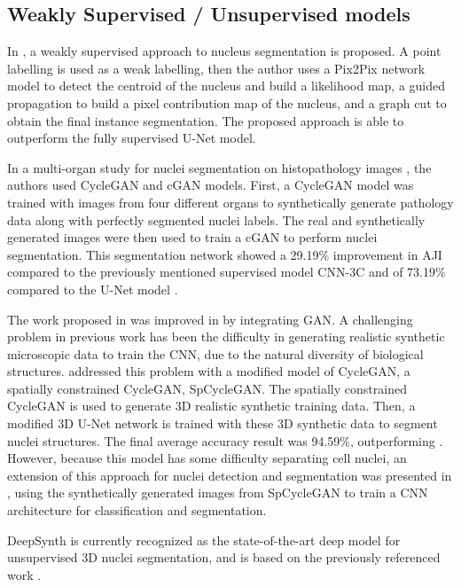 \subsection{Weakly Supervised / Unsupervised models}

In \cite{weakly:GAN}, a weakly supervised approach to nucleus segmentation is proposed. A point labelling is used as a weak labelling, then the author uses a Pix2Pix network model to detect the centroid of the nucleus and build a likelihood map, a guided propagation to build a pixel contribution map of the nucleus, and a graph cut to obtain the final instance segmentation. The proposed approach is able to outperform the fully supervised U-Net \cite{Unet:2D} model.

In a multi-organ study for nuclei segmentation on histopathology images \cite{cGAN:cycleGAN}, the authors used CycleGAN and \ac{cGAN} models. First, a CycleGAN model was trained with images from four different organs to synthetically generate pathology data along with perfectly segmented nuclei labels. The real and synthetically generated images were then used to train a \ac{cGAN} to perform nuclei segmentation. This segmentation network showed a 29.19\% improvement in \ac{AJI} compared to the previously mentioned supervised model \ac{CNN}-3C \cite{CNN3} and of 73.19\% compared to the U-Net model \cite{Unet:2D}.


The work proposed in \cite{SOTA:3DCNN} was improved in \cite{3D:CycleGAN} by integrating \ac{GAN}. A challenging problem in previous work has been the difficulty in generating realistic synthetic microscopic data to train the \ac{CNN}, due to the natural diversity of biological structures. \citet{3D:CycleGAN} addressed this problem with a modified model of CycleGAN, a spatially constrained CycleGAN, SpCycleGAN. The spatially constrained CycleGAN is used to generate \ac{3D} realistic synthetic training data. Then, a modified \ac{3D} U-Net network is trained with these \ac{3D} synthetic data to segment nuclei structures. The final average accuracy result was 94.59\%, outperforming \cite{SOTA:3DCNN}. However, because this model has some difficulty separating cell nuclei, an extension of this approach for nuclei detection and segmentation was presented in \cite{detection:3D}, using the synthetically generated images from SpCycleGAN to train a \ac{CNN} architecture for classification and segmentation.

DeepSynth \cite{deepsynth} is currently recognized as the state-of-the-art deep model for unsupervised \ac{3D} nuclei segmentation, and is based on the previously referenced work \cite{2dplus,SOTA:3DCNN,3D:CycleGAN}.

